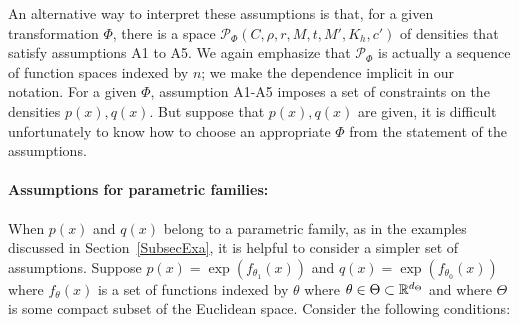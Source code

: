 An alternative way to interpret these assumptions is that, for a given transformation $\Phi$, there is a space $\mathcal{P}_{\Phi}(C, \rho, r, M, t, M', K_h, c')$ of densities that satisfy assumptions A1 to A5. We again emphasize that $\mathcal{P}_\Phi$ is actually a sequence of function spaces indexed by $n$; we make the dependence implicit in our notation. For a given $\Phi$, assumption A1-A5 imposes a set of constraints on the densities $p(x), q(x)$. But suppose that $p(x), q(x)$ are given, it is difficult unfortunately to know how to choose an appropriate $\Phi$ from the statement of the assumptions.


\paragraph{\textbf{Assumptions for parametric families:}} When $p(x)$ and $q(x)$ belong to a parametric family, as in the examples discussed in Section~\ref{SubsecExa}, it is helpful to consider a simpler set of assumptions. Suppose $p(x) = \exp( f_{\theta_1}(x))$ and $q(x) = \exp( f_{\theta_0}(x))$ where $f_{\theta}(x)$ is a set of functions indexed by $\theta$ where  $\theta \in \Theta \subset {\mathbb R}^{d_{\Theta}}$ and where $\Theta$ is some compact subset of the Euclidean space. Consider the following conditions:

